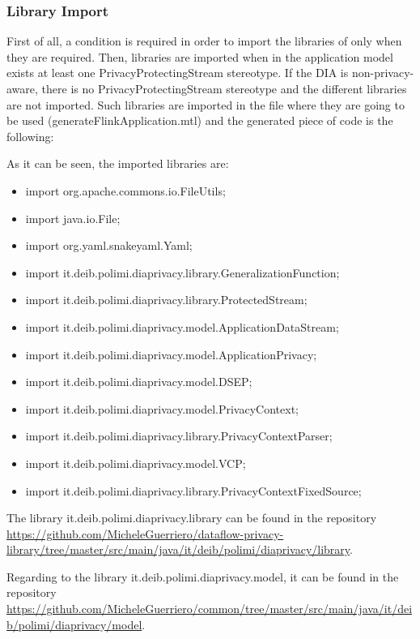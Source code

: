 \subsubsection{Library Import}

First of all, a condition is required in order to import the libraries of \cite{privacypoliciesarticle} only when they are required. Then, libraries are imported when in the application model exists at least one PrivacyProtectingStream stereotype. If the DIA is non-privacy-aware, there is no PrivacyProtectingStream stereotype and the different libraries are not imported. Such libraries are imported in the file where they are going to be used (generateFlinkApplication.mtl) and the generated piece of code is the following:



As it can be seen, the imported libraries are:

\begin{itemize}
\item import org.apache.commons.io.FileUtils;
\item import java.io.File;
\item import org.yaml.snakeyaml.Yaml;
\item import it.deib.polimi.diaprivacy.library.GeneralizationFunction;
\item import it.deib.polimi.diaprivacy.library.ProtectedStream;
\item import it.deib.polimi.diaprivacy.model.ApplicationDataStream;
\item import it.deib.polimi.diaprivacy.model.ApplicationPrivacy;
\item import it.deib.polimi.diaprivacy.model.DSEP;
\item import it.deib.polimi.diaprivacy.model.PrivacyContext;
\item import it.deib.polimi.diaprivacy.library.PrivacyContextParser;
\item import it.deib.polimi.diaprivacy.model.VCP;
\item import it.deib.polimi.diaprivacy.library.PrivacyContextFixedSource;
\end{itemize}

The library it.deib.polimi.diaprivacy.library can be found in the repository \url{https://github.com/MicheleGuerriero/dataflow-privacy-library/tree/master/src/main/java/it/deib/polimi/diaprivacy/library}.

Regarding to the library it.deib.polimi.diaprivacy.model, it can be found in the repository \url{https://github.com/MicheleGuerriero/common/tree/master/src/main/java/it/deib/polimi/diaprivacy/model}.

